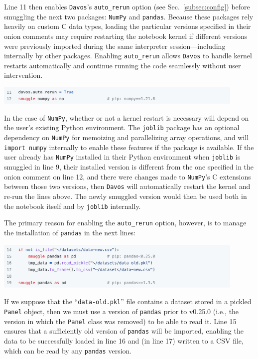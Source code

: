 \documentclass[preprint,12pt,a4paper]{elsarticle}
\begin{document}
Line 11 then enables
\texttt{Davos}'s \texttt{auto\_rerun} option (see Sec.~\ref{subsec:config}) before smuggling the next
two packages: \texttt{NumPy} and
\texttt{pandas}. Because these packages rely heavily on custom C data
types, loading the particular versions specified in their onion comments may
require restarting the notebook kernel if different versions were previously
imported during the same interpreter session---including internally by other packages.
Enabling \texttt{auto\_rerun} allows \texttt{Davos} to handle kernel restarts automatically and continue running the code seamlessly without user intervention.
\begin{center}
\includegraphics[width=0.9\textwidth]{figs/example3}
\end{center}
In the case of \texttt{NumPy}, whether or not a kernel restart is necessary will depend on the user's existing Python environment.
The \texttt{joblib} package has an optional dependency on \texttt{NumPy} for memoizing and parallelizing array operations, and will \texttt{import numpy} internally to enable these features if the package is available.
If the user already has \texttt{NumPy} installed in their Python environment when \texttt{joblib} is smuggled in line 9, their installed version is different from the one specified in the onion comment on line 12, and there were changes made to \texttt{NumPy}'s C extensions between those two versions, then \texttt{Davos} will automatically restart the kernel and re-run the lines above.
The newly smuggled version would then be used both in the notebook itself and by \texttt{joblib} internally.

The primary reason for enabling the \texttt{auto\_rerun} option, however, is to manage the installation of \texttt{pandas} in the next lines:
\begin{center}
\includegraphics[width=0.9\textwidth]{figs/example4}
\end{center}
If we suppose that the ``\texttt{data-old.pkl}'' file contains a dataset
stored in a pickled \texttt{Panel} object, then we must use a version of
\texttt{pandas} prior to v0.25.0 (i.e., the version in which the \texttt{Panel}
class was removed) to be able to read it. Line 15 ensures
that a sufficiently old version of \texttt{pandas} will be imported, enabling
the data to be successfully loaded in line 16 and (in line 17) written to a CSV
file, which can be read by any \texttt{pandas} version.
\end{document}
